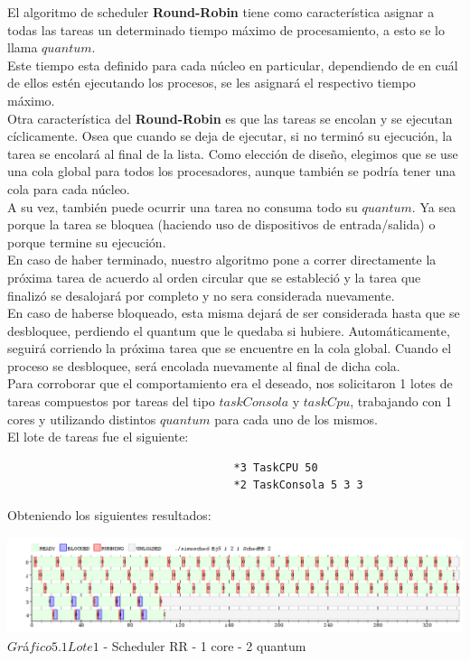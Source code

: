 \indent El algoritmo de scheduler \textbf{Round-Robin} tiene como caracter\'istica asignar a todas las tareas 
un determinado tiempo m\'aximo de procesamiento, a esto se lo llama $quantum$. \\
\indent Este tiempo esta definido para cada n\'ucleo en particular, dependiendo de en cu\'al de ellos est\'en 
ejecutando los procesos, se les asignar\'a el respectivo tiempo m\'aximo.\\
\indent Otra caracter\'istica del \textbf{Round-Robin} es que las tareas se encolan y se ejecutan c\'iclicamente. 
Osea que cuando se deja de ejecutar, si no termin\'o su ejecuci\'on, la tarea se encolar\'a al final de la lista. 
Como elecci\'on de diseño, elegimos que se use una cola global para todos los procesadores, aunque tambi\'en
se podr\'ia tener una cola para cada n\'ucleo. \\
\indent A su vez, tambi\'en puede ocurrir una tarea no consuma todo su $quantum$. 
Ya sea porque la tarea se bloquea (haciendo uso de dispositivos de entrada/salida) o porque termine su ejecuci\'on.\\
\indent En caso de haber terminado, nuestro algoritmo pone a correr directamente la pr\'oxima tarea de acuerdo al orden 
circular que se estableci\'o y la tarea que finaliz\'o se desalojar\'a por completo y no sera considerada nuevamente. \\
\indent En caso de haberse bloqueado, esta misma dejar\'a de ser considerada hasta que se desbloquee, 
perdiendo el quantum que le quedaba si hubiere. 
Autom\'aticamente, seguir\'a corriendo la pr\'oxima tarea que se encuentre en la cola global. 
Cuando el proceso se desbloquee, ser\'a encolada nuevamente al final de dicha cola.   \\

\indent Para corroborar que el comportamiento era el deseado, nos solicitaron 1 lotes de tareas compuestos por tareas
del tipo $taskConsola$ y $taskCpu$, trabajando con 1 cores y utilizando distintos $quantum$ para cada uno de los mismos.\\

El lote de tareas fue el siguiente:
\begin{verbatim}
                                   *3 TaskCPU 50
                                   *2 TaskConsola 5 3 3
\end{verbatim}

Obteniendo los siguientes resultados:

\begin{center}

    
	\includegraphics[width=450pt]{./Test/ej5_2.png}
	{$Gr$\'a$fico 5.1 Lote 1$ - Scheduler RR - 1 core - 2 quantum}	
 
\end{center}

